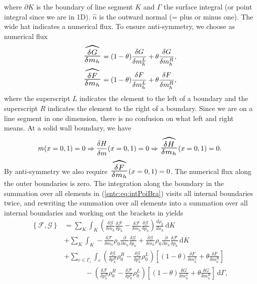 \documentclass{article}
\begin{document}
where $\partial K$ is the boundary of line segment $K$ and $\Gamma$ the surface integral (or point integral since we are in 1D). $\hat{n}$ is the outward normal (= plus or minus one). The wide hat indicates a numerical flux. To ensure anti-symmetry, we choose as numerical flux
\begin{equation}
	\begin{aligned}
		\scalebox{2}{$\widehat{\scalebox{0.725}{$\frac{\delta G}{\delta m_h}$}}$} = (1-\theta) \frac{\delta G}{\delta m_h^L} + \theta \frac{\delta G}{\delta m_h^R}, \\
		\scalebox{2}{$\widehat{\scalebox{0.725}{$\frac{\delta F}{\delta m_h}$}}$} = (1-\theta) \frac{\delta F}{\delta m_h^L} + \theta \frac{\delta F}{\delta m_h^R}, 
	\end{aligned}
\end{equation}
where the superscript $L$ indicates the element to the left of a boundary and the superscript $R$ indicates the element to the right of a boundary. Since we are on a line segment in one dimension, there is no confusion on what left and right means. At a solid wall boundary, we have
\begin{equation}
	m (x=0,1) = 0 \Rightarrow \frac{\delta H}{\delta m}(x=0,1) = 0 \Rightarrow \scalebox{2}{$\widehat{\scalebox{0.725}{$\frac{\delta H}{\delta m_h}$}}$}(x=0,1) = 0.
\end{equation}
By anti-symmetry we also require $\scalebox{2}{$\widehat{\scalebox{0.725}{$\frac{\delta F}{\delta m_h}$}}$}(x=0,1) = 0$. The numerical flux along the outer boundaries is zero. The integration along the boundary in the summation over all elements in (\ref{sntc:eq:intPoiBra}) visits all internal boundaries twice, and rewriting the summation over all elements into a summation over all internal boundaries and working out the brackets in yields
\begin{equation}
	\label{sntc:eq:ibtPoiBra}
	\begin{aligned}
\left\{\mathcal{F}, \mathcal{G}\right\} &= \sum_K \int_K \! \left(\frac{\delta \mathcal{G}}{\delta m_h}\frac{\delta \mathcal{F}}{\delta p_h} - \frac{\delta \mathcal{F}}{\delta m_h}  \frac{\delta \mathcal{G}}{\delta p_h} \right) \frac{d \rho_0}{d x_h}   \, \mathrm{d}K \\
&+ \sum_K \int_K \! - \frac{\delta \mathcal{F}}{\delta m_h} \rho_0  \frac{\partial}{\partial x_h} \frac{\delta \mathcal{G}}{\delta p_h} + \frac{\delta \mathcal{G}}{\delta m_h} \rho_0 \frac{\partial}{\partial x_h} \frac{\delta \mathcal{F}}{\delta p_h}  \, \mathrm{d}K \\
&+ \sum_{e \in \Gamma_i} \int_{e} \! \left(\frac{\delta \mathcal{G}}{\delta p_h^R} \rho_0^R - \frac{\delta \mathcal{G}}{\delta p_h^L} \rho_0^L \right) \left[  (1-\theta) \frac{\delta F}{\delta m_h^L} + \theta \frac{\delta F}{\delta m_h^R}\right] \\
& \quad \qquad - \left(\frac{\delta \mathcal{F}}{\delta p_h^R} \rho_0^R - \frac{\delta \mathcal{F}}{\delta p_h^L} \rho_0^L \right) \left[  (1-\theta) \frac{\delta G}{\delta m_h^L} + \theta \frac{\delta G}{\delta m_h^R}\right] \, \mathrm{d}\Gamma,
	\end{aligned}
\end{equation}	
\end{document}
